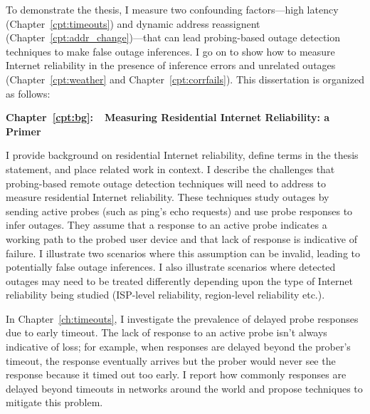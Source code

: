 To demonstrate the thesis, I measure two confounding factors---high
latency (Chapter~\ref{cpt:timeouts}) and dynamic address reassignent
(Chapter~\ref{cpt:addr_change})---that can lead probing-based outage
detection techniques to make false outage inferences. I go on to show how
to measure Internet reliability in the presence of inference errors
and unrelated outages (Chapter~\ref{cpt:weather} and
Chapter~\ref{cpt:corrfails}). This dissertation is organized as follows:



\textbf{Chapter~\ref{cpt:bg}:~~Measuring Residential Internet
  Reliability: a Primer}

I provide background on residential
Internet reliability, define terms in the thesis statement, and place
related work in context. I describe the challenges that probing-based
remote outage detection techniques will need to address to measure
residential Internet reliability. These techniques study outages by
sending active probes (such as ping's echo requests) and use probe
responses to infer outages. They assume that a response to an active
probe indicates a working path to the probed user device and that lack
of response is indicative of failure. I illustrate two scenarios where
this assumption can be invalid, leading to potentially false outage
inferences. I also illustrate scenarios where detected outages may
need to be treated differently depending upon the type of
Internet reliability being studied (ISP-level reliability,
region-level reliability etc.).

In Chapter~\ref{ch:timeouts}, I investigate the prevalence of delayed
probe responses due to early timeout. The
lack of response to an active probe isn't always indicative of loss;
for example, when
responses are delayed beyond the prober's timeout, the response
eventually arrives but the prober would never see the response because
it timed out too early. I report how commonly responses are delayed
beyond timeouts in
networks around the world and propose techniques to mitigate this
problem. 

